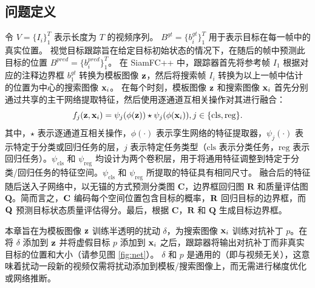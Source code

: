 \subsection{问题定义}
令 $V=\{I_i\}_1^T$ 表示长度为 $T$ 的视频序列。
$B^{gt}=\{b^{gt}_i\}_1^T$ 用于表示目标在每一帧中的真实位置。
视觉目标跟踪旨在给定目标初始状态的情况下，在随后的帧中预测此目标的位置 $B^{pred}=\{b^{pred}_i\}_1^T$。
在 SiamFC++ 中，跟踪器首先将参考帧 $I_1$ 根据对应的注释边界框 $b_1^{gt}$ 转换为模板图像 $\textbf z$，然后将搜索帧 $I_i$ 转换为以上一帧中估计的位置为中心的搜索图像 $\textbf x_i$。
在每个时刻，模板图像 $\textbf z$ 和搜索图像 $\textbf x_i$ 首先分别通过共享的主干网络提取特征，然后使用逐通道互相关操作对其进行融合：
\begin{equation}
f_{j}(\textbf z, \textbf x_i)=\psi_{j}(\phi(\textbf z)) \star \psi_{j}(\phi(\textbf x_i)), j \in\{\mathrm{cls}, \mathrm{reg}\}.
\end{equation}
其中，$\star$ 表示逐通道互相关操作，$\phi(\cdot)$ 表示孪生网络的特征提取器，$\psi_j(\cdot)$ 表示特定于分类或回归任务的层，$j$ 表示特定任务类型（$\mathrm{cls}$ 表示分类任务，$\mathrm{reg}$ 表示回归任务）。$\psi_{\mathrm{cls}}$ 和 $\psi_{\mathrm{reg}}$ 均设计为两个卷积层，用于将通用特征调整到特定于分类/回归任务的特征空间。$\psi_{\mathrm{cls}}$ 和 $\psi_{\mathrm{reg}}$ 所提取的特征具有相同尺寸。
融合后的特征随后送入子网络中，以无锚的方式预测分类图 $\textbf{C}$，边界框回归图 $\textbf{R}$ 和质量评估图 $\textbf{Q}$。简而言之，$\textbf C$ 编码每个空间位置包含目标的概率，$\textbf R$ 回归目标的边界框，而 $\textbf Q$ 预测目标状态质量评估得分。最后，根据 $\textbf{C}$，$\textbf{R}$ 和 $\textbf{Q}$ 生成目标边界框。

本章旨在为模板图像 $\textbf z$ 训练半透明的扰动 $\delta$，为搜索图像 $\textbf x_i$ 训练对抗补丁 $p$。在将 $\delta$ 添加到 $\textbf z$ 并将虚假目标 $p$ 添加到 $\textbf x_i$ 之后，跟踪器将输出对抗补丁而非真实目标的位置和大小（请参见图 \ref{fig:net}）。
$\delta$ 和 $p$ 是通用的（即与视频无关），这意味着扰动一段新的视频仅需将扰动添加到模板/搜索图像上，而无需进行梯度优化或网络推断。

